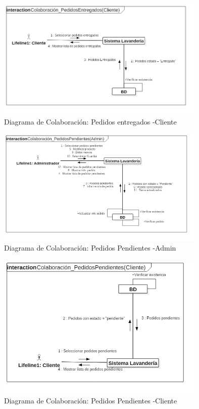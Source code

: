\begin{figure}[htb]
\begin{center}
\includegraphics[width=10cm]{./imagenes/diagramas/Colaboracion_PedidosEntregados(Cliente).png}
\end{center}
\caption{Diagrama de Colaboración: Pedidos entregados -Cliente}
\end{figure}


\begin{figure}[htb]
\begin{center}
\includegraphics[width=10cm]{./imagenes/diagramas/Colaboracion_PedidosPendientes(Admin).png}
\end{center}
\caption{Diagrama de Colaboración: Pedidos Pendientes -Admin }
\end{figure}


\begin{figure}[htb]
\begin{center}
\includegraphics[width=10cm]{./imagenes/diagramas/Colaboracion_PedidosPendientes(Cliente).png}
\end{center}
\caption{Diagrama de Colaboración: Pedidos Pendientes -Cliente}
\end{figure}



